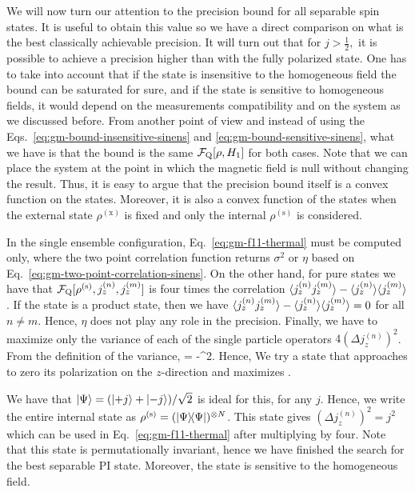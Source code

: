 
We will now turn our attention to the precision bound for all separable spin states.
It is useful to obtain this value so we have a direct comparison on what is the best classically achievable precision.
It will turn out that for $j>\frac{1}{2},$ it is possible
to achieve a precision higher than with the fully polarized state.
One has to take into account that if the state is insensitive to the homogeneous field the bound can be saturated for sure, and if the state is sensitive to homogeneous fields, it would depend on the measurements compatibility and on the system as we discussed before.
From another point of view and instead of using the Eqs.~\eqref{eq:gm-bound-insensitive-sinens} and \eqref{eq:gm-bound-sensitive-sinens}, what we have is that the bound is the same $\mathcal{F}_{\textnormal{Q}}[{\textstyle \rho, H_1}]$ for both cases.
Note that we can place the system at the point in which the magnetic field is null without changing the result.
Thus, it is easy to argue that the precision bound itself is a convex function on the states.
Moreover, it is also a convex function of the states when the external state $\rho^{(\text{x})}$ is fixed and only the internal $\rho^{(\text{s})}$ is considered.

In the single ensemble configuration, Eq.~\eqref{eq:gm-f11-thermal} must be computed only, where the two point correlation function returns $\sigma^2$ or $\eta$ based on Eq.~\eqref{eq:gm-two-point-correlation-sinens}.
On the other hand, for pure states we have that $\mathcal{F}_{\textnormal{Q}}[{\textstyle \rho^{(\text{s})}, j_z^{(n)}, j_z^{(m)}}]$ is four times the correlation $\langle{j_z^{(n)}j_z^{(m)}}\rangle-\langle{j_z^{(n)}}\rangle\langle{j_z^{(m)}}\rangle$.
If the state is a product state, then we have  $\langle{j_z^{(n)}j_z^{(m)}}\rangle-\langle{j_z^{(n)}}\rangle\langle{j_z^{(m)}}\rangle=0$ for all $n\neq m$.
Hence, $\eta$ does not play any role in the precision.
Finally, we have to maximize only the variance of each of the single particle operators $4(\Delta j_z^{(n)})^2$.
From the definition of the variance,
\be
   = -^2.
\ee
Hence, We try a state that approaches to zero its polarization on the $z$-direction and maximizes .

We have that  $\vert{\Psi}\rangle=(\vert{+j}\rangle+\vert{-j}\rangle)/\sqrt{2}$ is ideal for this, for any $j$.
Hence, we write the entire internal state as $\rho^{(\text{s})} =(\vert{\Psi}\rangle{\!}\langle{\Psi}\vert)^{\otimes N}$.
This state gives $(\Delta j_z^{(n)})^2=j^2$ which can be used in Eq.~\eqref{eq:gm-f11-thermal} after multiplying by four.
Note that this state is permutationally invariant, hence we have finished the search for the best separable PI state.
Moreover, the state is sensitive to the homogeneous field.


